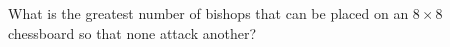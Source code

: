 What is the greatest number of bishops that can be placed on an $8\times8$ chessboard so that none attack another?
